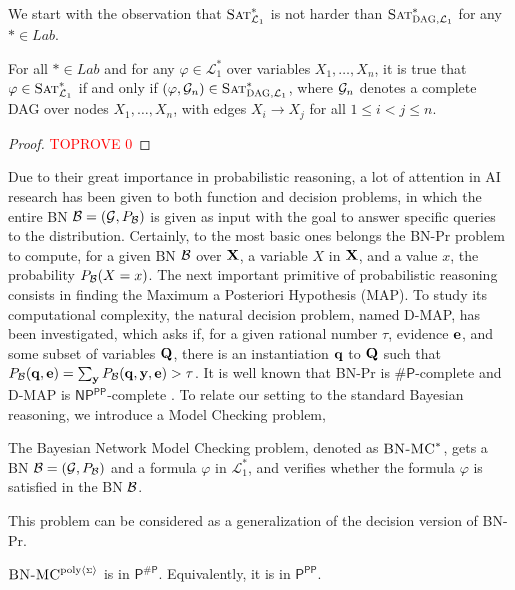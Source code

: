 \documentclass[a4paper,UKenglish,cleveref, autoref, thm-restate]{lipics-v2021}
\newcommand{\compactEquals}[1]{\let\IsInPP=1#1\let\IsInPP=\relax}
\newcommand{\NP}{\ensuremath{\mathsf{NP}}}
\newcommand{\cP}{\ensuremath{\mathsf{P}}}
\newcommand{\ccPP}{\ensuremath{\mathsf{PP}}}
\newcommand{\sharpP}{\#\mathsf{P}}
\newcommand{\cL}{{\mathcal L}}
\newcommand{\bQ}{{\bf Q}}
\newcommand{\bX}{{\bf X}}
\newcommand{\cB}{{\cal B}}
\newcommand{\cG}{{\cal G}}
\newcommand{\be}{{\bf e}}
\newcommand{\bq}{{\bf q}}
\newcommand{\by}{{\bf y}}
\def\Lprobstar{\cL^{*}_{1}}
\def\Lab{\textit{Lab}}
\newcommand{\SATprobstar}{\mbox{\sc Sat}^{*}_{{\cL_1}}}
\newcommand{\SATprobstargraph}{\mbox{\sc Sat}^{*}_{\mbox{\scriptsize\sc DAG}, {\cL_1}}}
\def\probsumBN#1{^{\text{#1}{\langle{\scriptscriptstyle\Sigma}\rangle}}}
\newcommand{\SATprobstarBN}{\mbox{\sc BN-MC}^{*}}
\newcommand{\SATprobpolysumBN}{\mbox{\sc BN-MC}\probsumBN{poly}}
\begin{document}
We start with the observation that $\SATprobstar$ is not harder than $\SATprobstargraph$ for any $*\in \Lab$. \begin{proposition} \label{prop:DAG:notharder}
\label{fact:sat:sat_with_graph}
    For all  $*\in \Lab$ and 
    for any $\varphi\in \Lprobstar$ over variables $X_1,\ldots,X_n$,
    it is true that $\varphi\in\SATprobstar$ if and only if $(\varphi,\cG_n)\in\SATprobstargraph$,
    where $\cG_n$ denotes a complete DAG over nodes $X_1,\ldots,X_n$,
    with edges $X_i \to X_j$ for all $1\le i < j \le n$.
  \end{proposition}
  \begin{proof}\textcolor{red}{TOPROVE 0}\end{proof}




Due to their great importance in probabilistic reasoning, a lot of attention in AI research has been given to both function 
and decision problems, in which the entire 
BN $\cB=(\cG,P_{\cB})$ is given as input with the goal to answer specific queries to the distribution. 
Certainly, to the most basic ones belongs the {\sc BN-Pr} problem to compute,
for a given BN $\cB$ over $\bX$, a variable $X$ in $\bX$, and a value $x$,
the probability $\compactEquals{P_{\cB}(X=x)}$. The next important 
primitive of probabilistic reasoning
consists in finding the Maximum a Posteriori Hypothesis (MAP).
To study its computational complexity, the natural decision problem, named {\sc D-MAP},
has been investigated, which asks if, for a given rational number $\tau$, evidence $\be$, 
and some subset of variables $\bQ$, there is an instantiation $\bq$ to $\bQ$ such that 
$P_{\cB}(\bq,\be) = \sum_{\by} P_{\cB}(\bq,\by,\be)>\tau$.
It is well known that {\sc BN-Pr} is $\sharpP$-complete and 
{\sc D-MAP} is \NP$^{\ccPP}$-complete \cite{roth1996hardness,park2004complexity}.
To relate our setting to the standard Bayesian reasoning, we introduce 
a Model Checking problem,
\begin{definition}
The Bayesian Network Model Checking problem, denoted as $\SATprobstarBN$, 
gets a BN $\cB=(\cG,P_{\cB})$ and a formula $\varphi$ in $\Lprobstar$,
and verifies whether the formula $\varphi$ is satisfied in the BN $\cB$. 
\end{definition}
This problem can be considered as a generalization of the decision version of {\sc BN-Pr}.

\begin{theorem}\label{thm:SATproblinbBN:DAG}
	$\SATprobpolysumBN$ is in $\cP^{\sharpP}$.
	Equivalently, it is in $\cP^{\ccPP}$.
\end{theorem}
\end{document}
